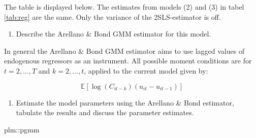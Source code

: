 \documentclass[
]{article}
\newenvironment{Shaded}{\begin{snugshade}}{\end{snugshade}}
\newcommand{\NormalTok}[1]{#1}
\newcommand{\SpecialCharTok}[1]{\textcolor[rgb]{0.00,0.00,0.00}{#1}}
\providecommand{\tightlist}{%
  \setlength{\itemsep}{0pt}\setlength{\parskip}{0pt}}
\let\oldShaded\Shaded
\let\endoldShaded\endShaded
\renewenvironment{Shaded}{\footnotesize\oldShaded}{\endoldShaded}
\begin{document}
The table is displayed below. The estimates from models (2) and (3) in
tabel \ref{tab:reg} are the same. Only the variance of the
2SLS-estimator is off.

\begin{enumerate}
\def\labelenumi{\arabic{enumi}.}
\setcounter{enumi}{3}
\tightlist
\item
  Describe the Arellano \& Bond GMM estimator for this model.
\end{enumerate}

In general the Arellano \& Bond GMM estimator aims to use lagged values
of endogenous regressors as an instrument. All possible moment
conditions are for \(t=2,\dots,T\) and \(k=2,\dots,t\), applied to the
current model given by:

\begin{equation*}
\mathbb{E}[\log(C_{it-k})(u_{it}-u_{it-1})]
\end{equation*}

\begin{enumerate}
\def\labelenumi{\arabic{enumi}.}
\setcounter{enumi}{4}
\tightlist
\item
  Estimate the model parameters using the Arellano \& Bond estimator,
  tabulate the results and discuss the parameter estimates.
\end{enumerate}

\begin{Shaded}
\begin{Highlighting}[]
\NormalTok{plm}\SpecialCharTok{::}\NormalTok{pgmm}
\end{Highlighting}
\end{Shaded}
\end{document}
